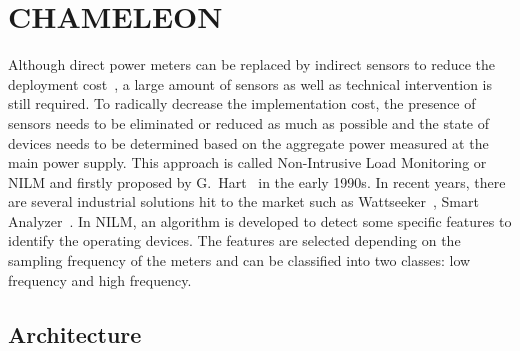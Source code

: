 \section{CHAMELEON}\label{NILM}
Although direct power meters can be replaced by indirect sensors to reduce the deployment cost~\cite{Kim09Ubicomp,Jung2010,Jung2014}, a large amount of sensors as well as technical intervention is still required. To radically decrease the implementation cost, the presence of sensors needs to be eliminated or reduced as much as possible and the state of devices needs to be determined based on the aggregate power measured at the main power supply. This approach is called Non-Intrusive Load Monitoring or NILM and firstly proposed by G.~Hart~\cite{Hart92} in the early 1990s. In recent years, there are several industrial solutions hit to the market such as Wattseeker~\cite{Wattseeker}, Smart Analyzer~\cite{smartanalyzer}. In NILM, an algorithm is developed to detect some specific features to identify the operating devices. The features are selected depending on the sampling frequency of the meters and can be classified into two classes: low frequency and high frequency.

\subsection{Architecture}\label{macro}

